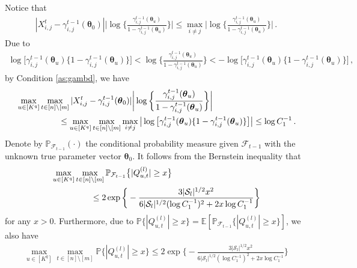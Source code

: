 \documentclass[12pt]{article}
\newcommand{\btheta}{\boldsymbol \theta}
\newcommand{\0}{{\bf 0}}
\begin{document}
Notice that   
\begin{align*}
|X_{i,j}^t-\gamma_{i,j}^{t-1}(\btheta_0)|\bigg|\log\bigg\{\frac{\gamma_{i,j}^{t-1}(\btheta_u)}{1-\gamma_{i,j}^{t-1}(\btheta_u)}\bigg\}\bigg|\leq \max_{i\neq j}\bigg|\log\bigg\{\frac{\gamma_{i,j}^{t-1}(\btheta_u)}{1-\gamma_{i,j}^{t-1}(\btheta_u)}\bigg\}\bigg|\,.
\end{align*}
Due to 
\begin{align*}
\log\big[\gamma_{i,j}^{t-1}(\btheta_u)\{1-\gamma_{i,j}^{t-1}(\btheta_u)\}\big]<\log\bigg\{\frac{\gamma_{i,j}^{t-1}(\btheta_u)}{1-\gamma_{i,j}^{t-1}(\btheta_u)}\bigg\}<-\log\big[\gamma_{i,j}^{t-1}(\btheta_u)\{1-\gamma_{i,j}^{t-1}(\btheta_u)\}\big]\,,
\end{align*}
by Condition \ref{as:gambd}, we have
\begin{align}
&\max_{u\in[K^q]}\max_{t\in[n]\setminus[m]}|X_{i,j}^t-\gamma_{i,j}^{t-1}(\btheta_0)|\bigg|\log\bigg\{\frac{\gamma_{i,j}^{t-1}(\btheta_u)}{1-\gamma_{i,j}^{t-1}(\btheta_u)}\bigg\}\bigg| \notag\\
&~~~~~~~~~~~~~~~\leq\max_{u\in[K^q]}\max_{t\in[n]\setminus[m]}\max_{i\neq j}\big|\log\big[\gamma_{i,j}^{t-1}(\btheta_u)\{1-\gamma_{i,j}^{t-1}(\btheta_u)\}\big]\big|\leq \log C_1^{-1}\,. \label{eq:boundQ}
\end{align}
Denote by $\mathbb{P}_{\mathcal{F}_{t-1}}(\cdot)$ the conditional probability measure given $\mathcal{F}_{t-1}$ with the unknown true parameter vector $\btheta_0$. It follows from the Bernstein inequality that
\begin{align}\label{eq:condtailQ}
&\max_{u\in[K^q]}\max_{t\in[n]\setminus[m]}\mathbb{P}_{\mathcal{F}_{t-1}}\big\{|Q_{u,t}^{(l)}|\geq x\big\}\notag\\
&~~~~~~~~~~~~~~\leq 2\exp\bigg\{-\frac{3|\mathcal{S}_l|^{1/2}x^2}{6|\mathcal{S}_l|^{1/2}(\log C_1^{-1})^2+2x\log C_1^{-1}}\bigg\}
\end{align}
for any $x>0$. Furthermore, due to $\mathbb{P}\{|Q_{u,t}^{(l)}|\geq x\}=\mathbb{E}[\mathbb{P}_{\mathcal{F}_{t-1}}\{|Q_{u,t}^{(l)}|\geq x\}]$, we also have 
\begin{align}\label{eq:tailQ}
\max_{u\in[K^q]}\max_{t\in[n]\setminus[m]}\mathbb{P}\big\{|Q_{u,t}^{(l)}|\geq x\big\}\leq 2\exp\bigg\{-\frac{3|\mathcal{S}_l|^{1/2}x^2}{6|\mathcal{S}_l|^{1/2}(\log C_1^{-1})^2+2x\log C_1^{-1}}\bigg\}
\end{align}
\end{document}

